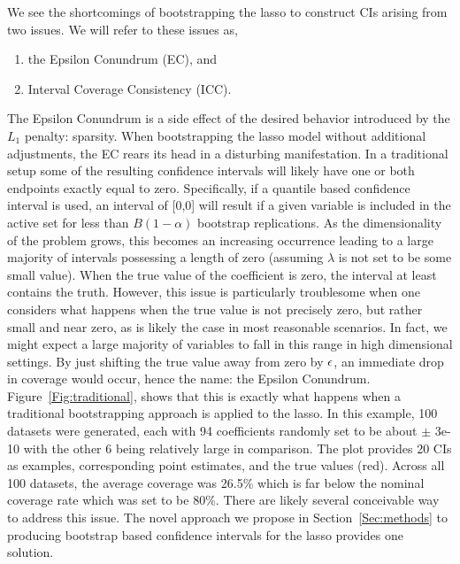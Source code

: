 We see the shortcomings of bootstrapping the lasso to construct CIs arising from two issues. We will refer to these issues as,

\begin{enumerate}
\item the Epsilon Conundrum (EC), and
\item Interval Coverage Consistency (ICC).
\end{enumerate}

The Epsilon Conundrum is a side effect of the desired behavior introduced by the $L_1$ penalty: sparsity. When bootstrapping the lasso model without additional adjustments, the EC rears its head in a disturbing manifestation. In a traditional setup some of the resulting confidence intervals will likely have one or both endpoints exactly equal to zero. Specifically, if a quantile based confidence interval is used, an interval of [0,0] will result if a given variable is included in the active set for less than $B(1 - \alpha)$ bootstrap replications. As the dimensionality of the problem grows, this becomes an increasing occurrence leading to a large majority of intervals possessing a length of zero (assuming $\lambda$ is not set to be some small value). When the true value of the coefficient is zero, the interval at least contains the truth. However, this issue is particularly troublesome when one considers what happens when the true value is not precisely zero, but rather small and near zero, as is likely the case in most reasonable scenarios. In fact, we might expect a large majority of variables to fall in this range in high dimensional settings. By just shifting the true value away from zero by $\epsilon$, an immediate drop in coverage would occur, hence the name: the Epsilon Conundrum. Figure~\ref{Fig:traditional}, shows that this is exactly what happens when a traditional bootstrapping approach is applied to the lasso. In this example, 100 datasets were generated, each with 94 coefficients randomly set to be about $\pm$ 3e-10 with the other 6 being relatively large in comparison. The plot provides 20 CIs as examples, corresponding point estimates, and the true values (red). Across all 100 datasets, the average coverage was 26.5\% which is far below the nominal coverage rate which was set to be 80\%. There are likely several conceivable way to address this issue. The novel approach we propose in Section~\ref{Sec:methods} to producing bootstrap based confidence intervals for the lasso provides one solution.

